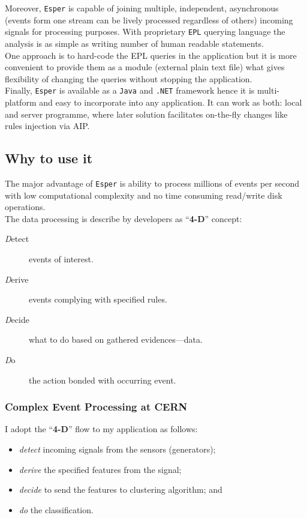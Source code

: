 \documentclass[11pt, letterpaper]{article}            %
\begin{document}
Moreover, \texttt{Esper} is capable of joining multiple, independent, asynchronous (events form one stream can be lively processed regardless of others) incoming signals for processing purposes. With proprietary \texttt{EPL} querying language the analysis is as simple as writing number of human readable statements.\\
One approach is to hard-code the EPL queries in the application but it is more convenient to provide them as a module (external plain text file) what gives flexibility of changing the queries without stopping the application.\\

Finally, \texttt{Esper} is available as a \texttt{Java} and \texttt{.NET} framework hence it is multi-platform and easy to incorporate into any application. It can work as both: local and server programme, where later solution facilitates on-the-fly changes like rules injection via AIP.\\

\subsection{Why to use it}
The major advantage of \texttt{Esper} is ability to process millions of events per second with low computational complexity and no time consuming read/write disk operations.\\
The data processing is describe by developers as ``\textbf{4-D}'' concept:
\begin{description}
\item[\textit{D}etect] events of interest.
\item [\textit{D}erive] events complying with specified rules.
\item [\textit{D}ecide] what to do based on gathered evidences---data.
\item [\textit{D}o] the action bonded with occurring event.
\end{description}

\subsubsection{Complex Event Processing at CERN}
I adopt the ``\textbf{4-D}'' flow to my application as follows:
\begin{itemize}
\item \emph{detect} incoming signals from the sensors (generators);
\item \emph{derive} the specified features from the signal;
\item \emph{decide} to send the features to clustering algorithm; and
\item \emph{do} the classification.
\end{itemize}
\end{document}
